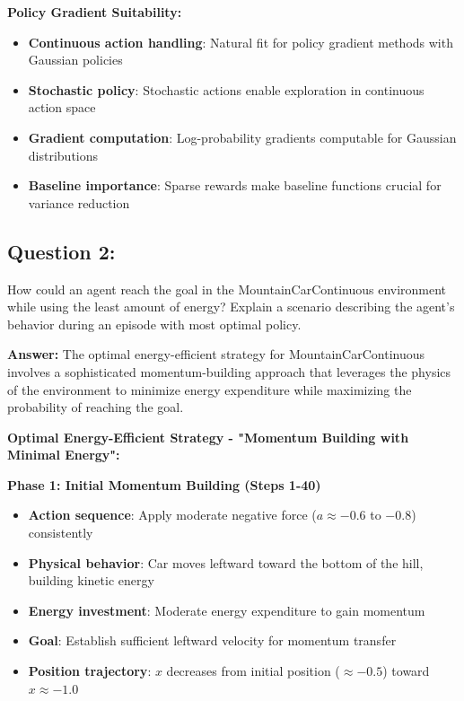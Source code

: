 \documentclass[12pt]{article}
\begin{document}
{{{\textbf{Policy Gradient Suitability:}
\begin{itemize}
    \item \textbf{Continuous action handling}: Natural fit for policy gradient methods with Gaussian policies
    \item \textbf{Stochastic policy}: Stochastic actions enable exploration in continuous action space
    \item \textbf{Gradient computation}: Log-probability gradients computable for Gaussian distributions
    \item \textbf{Baseline importance}: Sparse rewards make baseline functions crucial for variance reduction
\end{itemize}

\subsection{Question 2:}

How could an agent reach the goal in the MountainCarContinuous environment while using the least amount of energy? Explain a scenario describing the agent's behavior during an episode with most optimal policy.
\vspace*{0.3cm}

\textbf{Answer:} The optimal energy-efficient strategy for MountainCarContinuous involves a sophisticated momentum-building approach that leverages the physics of the environment to minimize energy expenditure while maximizing the probability of reaching the goal.

\textbf{Optimal Energy-Efficient Strategy - "Momentum Building with Minimal Energy":}

\textbf{Phase 1: Initial Momentum Building (Steps 1-40)}
\begin{itemize}
    \item \textbf{Action sequence}: Apply moderate negative force ($a \approx -0.6$ to $-0.8$) consistently
    \item \textbf{Physical behavior}: Car moves leftward toward the bottom of the hill, building kinetic energy
    \item \textbf{Energy investment}: Moderate energy expenditure to gain momentum
    \item \textbf{Goal}: Establish sufficient leftward velocity for momentum transfer
    \item \textbf{Position trajectory}: $x$ decreases from initial position ($\approx -0.5$) toward $x \approx -1.0$
\end{itemize}

}}}
\end{document}
